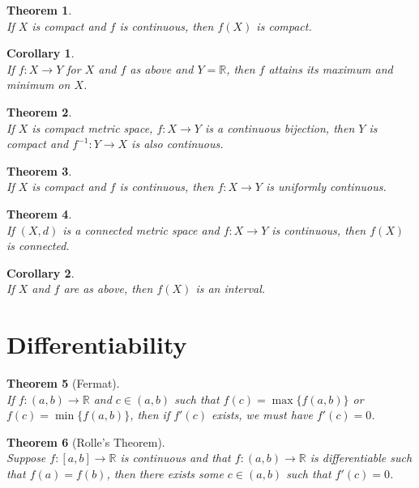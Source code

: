 \documentclass[10pt,a4paper]{article}
\newtheorem{theorem}{Theorem}
\newtheorem{corollary}{Corollary}
\theoremstyle{definition}
\theoremstyle{definition}
\numberwithin{equation}{section}
\numberwithin{theorem}{section}
\numberwithin{proposition}{section}
\numberwithin{lemma}{section}
\numberwithin{corollary}{section}
\begin{document}
\begin{theorem}$ $
\\If $X$ is compact and $f$ is continuous, then $f(X)$ is compact. 
\end{theorem}

\begin{corollary}$ $
\\If $f: X \to Y$ for $X$ and $f$ as above and $Y = \mathbb{R}$, then $f$ attains its maximum and minimum on $X$. 
\end{corollary}

\begin{theorem}$ $
\\If $X$ is compact metric space, $f: X \to Y$ is a continuous bijection, then $Y$ is compact and $f^{-1}: Y \to X$ is also continuous.
\end{theorem}

\begin{theorem}$ $
\\If $X$ is compact and $f$ is continuous, then $f: X \to Y$ is uniformly continuous. 
\end{theorem}

\begin{theorem}$ $
\\If $(X, d)$ is a connected metric space and $f: X \to Y$ is continuous, then $f(X)$ is connected. 
\end{theorem}

\begin{corollary}$ $
\\If $X$ and $f$ are as above, then $f(X)$ is an interval.
\end{corollary}


\newpage
\section{Differentiability}

\begin{theorem}[Fermat]$ $
\\If $f: (a, b) \to \mathbb{R}$ and $c \in (a, b)$ such that $f(c) = \max\{f(a, b)\}$ or $f(c) = \min\{f(a, b)\}$, then if $f'(c)$ exists, we must have $f'(c) = 0$. 
\end{theorem}

\begin{theorem}[Rolle's Theorem]$ $
\\Suppose $f: [a, b] \to \mathbb{R}$ is continuous and that $f: (a, b) \to \mathbb{R}$ is differentiable such that $f(a) = f(b)$, then there exists some $c \in (a, b)$ such that $f'(c) = 0$. 
\end{theorem}
\end{document}
